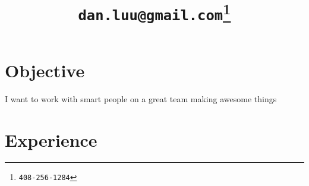 \documentclass[letterpaper]{scrartcl}
\begin{document}
\title{\vspace{-6ex}\tt{dan.luu@gmail.com\footnote{408-256-1284}}}
\date{\vspace{-10ex}}
\author{}
\maketitle

%
%



%
%
\section*{Objective}
\begin{list1}
\item I want to work with smart people on a great team making awesome things
\end{list1}

\section*{Experience}
\end{document}

